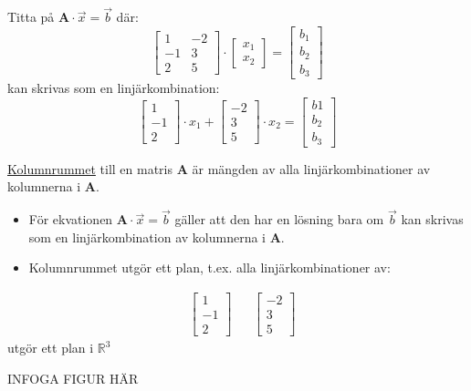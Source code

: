Titta på $\mathbf{A} \cdot \vec{x} = \vec{b}$ där:
\[
    \begin{bmatrix} 1&-2\\-1&3\\2&5 \end{bmatrix} \cdot \begin{bmatrix} x_1\\x_2 \end{bmatrix} = \begin{bmatrix} b_1\\b_2\\b_3 \end{bmatrix}
\]
kan skrivas som en linjärkombination:
\[
    \begin{bmatrix} 1\\-1\\2 \end{bmatrix} \cdot x_1 + \begin{bmatrix} -2\\3\\5 \end{bmatrix} \cdot x_2 = \begin{bmatrix} b1\\b_2\\b_3 \end{bmatrix}
\]
\begin{Def}
    \underline{Kolumnrummet} till en matris \textbf{A} är mängden av alla linjärkombinationer av kolumnerna i \textbf{A}.
\end{Def}
\begin{itemize}
	\item För ekvationen $\mathbf{A} \cdot \vec{x} = \vec{b}$ gäller att den har en lösning bara om $\vec{b}$ kan skrivas som en linjärkombination av kolumnerna i \textbf{A}.
	\item Kolumnrummet utgör ett plan, t.ex. alla linjärkombinationer av:
\end{itemize}
\begin{align*}
&\begin{bmatrix} 1\\-1\\2 \end{bmatrix}
&&\begin{bmatrix} -2\\3\\5 \end{bmatrix}
\end{align*}
utgör ett plan i $\mathbb{R}^3$
\begin{center}
	INFOGA FIGUR HÄR
\end{center}
